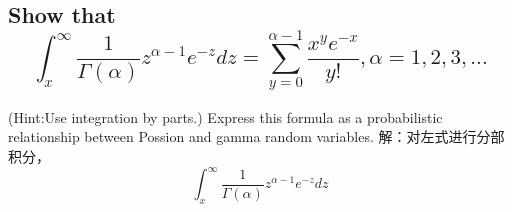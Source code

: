 \documentclass [12pt]{article}
\begin{document}
\begin{CJK*}{GBK}{kai}
\section{Show that\\
     $$\int_{x}^{\infty}\frac{1}{\Gamma(\alpha)}z^{\alpha-1}e^{-z}dz=\sum_{y=0}^{\alpha-1}\frac{x^ye^{-x}}{y!},\alpha=1,2,3,...$$}
     (Hint:Use integration by parts.) Express this formula as a probabilistic relationship between Possion and gamma random variables.
	解：对左式进行分部积分， $$\int_{x}^{\infty}\frac{1}{\Gamma(\alpha)}z^{\alpha-1}e^{-z}dz$$


  \end{CJK*}
\end{document}
